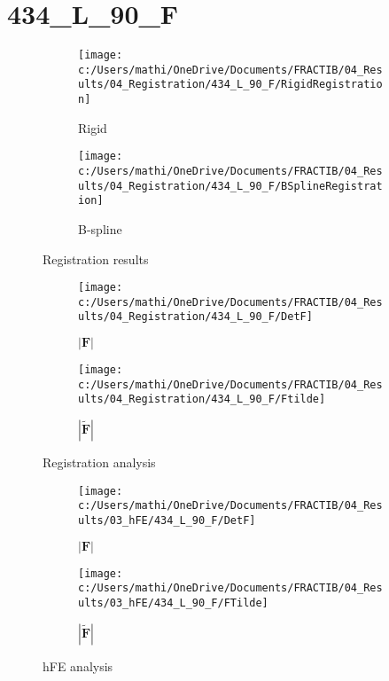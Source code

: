 \documentclass{article}%
\begin{document}
%
\newpage%
\section*{434\_L\_90\_F}%
\label{sec:434L90F}%


\begin{figure}[h!]%
\begin{subfigure}[b]{0.5\linewidth}%
\texttt{[image: c:/Users/mathi/OneDrive/Documents/FRACTIB/04\_Results/04\_Registration/434\_L\_90\_F/RigidRegistration]}%
\caption{Rigid}%
\end{subfigure}%
\begin{subfigure}[b]{0.5\linewidth}%
\texttt{[image: c:/Users/mathi/OneDrive/Documents/FRACTIB/04\_Results/04\_Registration/434\_L\_90\_F/BSplineRegistration]}%
\caption{B{-}spline}%
\end{subfigure}%
\caption{Registration results}%
\end{figure}

%


\begin{figure}[h!]%
\begin{subfigure}[b]{0.5\linewidth}%
\texttt{[image: c:/Users/mathi/OneDrive/Documents/FRACTIB/04\_Results/04\_Registration/434\_L\_90\_F/DetF]}%
\caption{$|\mathbf{F}|$}%
\end{subfigure}%
\begin{subfigure}[b]{0.5\linewidth}%
\texttt{[image: c:/Users/mathi/OneDrive/Documents/FRACTIB/04\_Results/04\_Registration/434\_L\_90\_F/Ftilde]}%
\caption{$|\widetilde{\mathbf{F}}|$}%
\end{subfigure}%
\caption{Registration analysis}%
\end{figure}

%


\begin{figure}[h!]%
\begin{subfigure}[b]{0.5\linewidth}%
\texttt{[image: c:/Users/mathi/OneDrive/Documents/FRACTIB/04\_Results/03\_hFE/434\_L\_90\_F/DetF]}%
\caption{$|\mathbf{F}|$}%
\end{subfigure}%
\begin{subfigure}[b]{0.5\linewidth}%
\texttt{[image: c:/Users/mathi/OneDrive/Documents/FRACTIB/04\_Results/03\_hFE/434\_L\_90\_F/FTilde]}%
\caption{$|\widetilde{\mathbf{F}}|$}%
\end{subfigure}%
\caption{hFE analysis}%
\end{figure}
\end{document}

